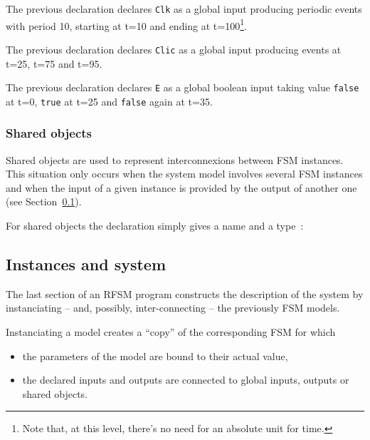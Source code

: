 The previous declaration declares \verb|Clk| as a global input producing periodic events with period 10, starting
  at t=10 and ending at t=100\footnote{Note that, at this level, there's no need for an absolute
    unit for time.}.

\begin{center}
\end{center}

The previous declaration declares \verb|Clic| as a global input producing events at t=25, t=75 and
  t=95.

\begin{center}
\end{center}

The previous declaration declares \verb|E| as a global boolean input taking value \texttt{false} at
t=0, \texttt{true} at t=25 and \texttt{false} again at t=35.

\subsubsection*{Shared objects}
\label{sec:shared}

Shared objects are used to represent interconnexions between FSM instances. This situation only
occurs when the system model involves several FSM instances and when the input of a given instance
is provided by the output of another one (see Section~\ref{sec:fsm-instances}).

\step For shared objects the declaration simply gives a name and a type~:

\begin{center}
\end{center}

\subsection{Instances and system}
\label{sec:fsm-instances}

The last section of an RFSM program constructs the description of the system by instanciating
-- and, possibly, inter-connecting -- the previously FSM models.

\medskip
Instanciating a model creates a ``copy'' of the corresponding FSM for which
\begin{itemize}
\item the parameters of the model are bound to their actual value,
\item the declared inputs and outputs are connected to global inputs, outputs or shared
  objects.
\end{itemize}

